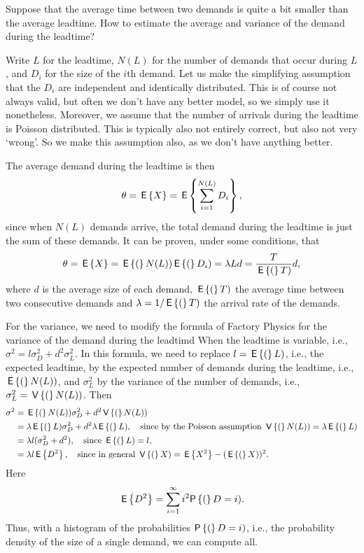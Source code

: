 \begin{question}
  Suppose that the average time between two demands is quite a bit smaller than the average leadtime. How to estimate the average and variance of the demand during the leadtime?
\begin{solution}
  Write $L$ for the leadtime, $N(L)$ for the number of demands that
  occur during $L$, and $D_i$ for the size of the $i$th demand. Let us
  make the simplifying assumption that the $D_i$ are independent and
  identically distributed. This is of course not always valid, but
  often we don't have any better model, so we simply use it
  nonetheless. Moreover, we assume that the number of arrivals during
  the leadtime is Poisson distributed. This is typically also not
  entirely correct, but also not very `wrong'. So we make this
  assumption also, as we don't have anything better.

The average demand during the leadtime is then
\begin{equation*}
\theta = \,\mathsf{E}\left\{X\right\}= \,\mathsf{E}\left\{\sum_{i=1}^{N(L)} D_i\right\},
\end{equation*}
since when $N(L)$ demands arrive, the total demand during the leadtime is just the sum of these demands. It can be proven, under some conditions, that 
\begin{equation*}
  \theta = \,\mathsf{E}\left\{X\right\} = \,\mathsf{E}\left\{(\right\}N(L))\,\mathsf{E}\left\{(\right\}D_i) = \lambda L d=\frac{T}{\,\mathsf{E}\left\{(\right\}T)} d,
\end{equation*}
where $d$ is the average size of each demand, $\,\mathsf{E}\left\{(\right\}T)$ the average
time between two consecutive demands and $\lambda=1/\,\mathsf{E}\left\{(\right\}T)$ the arrival
rate of the demands. 

For the variance, we need to modify the formula of Factory Physics for
the variance of the demand during the leadtimd When the leadtime is
variable, i.e., $\sigma^2 = l\sigma_D^2+d^2 \sigma_L^2$.  In this
formula, we need to replace $l=\,\mathsf{E}\left\{(\right\}L)$, i.e., the expected leadtime, by
the expected number of demands during the leadtime, i.e., $\,\mathsf{E}\left\{(\right\}N(L))$,
and $\sigma_L^2$ by the variance of the number of demands, i.e.,
$\sigma_L^2 = \,\mathsf{V}\left\{(\right\}N(L))$.  Then
\begin{equation*}
  \begin{split}
  \sigma^2 
&= \,\mathsf{E}\left\{(\right\}N(L)) \sigma_D^2+ d^2 \,\mathsf{V}\left\{(\right\}N(L))\\
&= \lambda \,\mathsf{E}\left\{(\right\}L)  \sigma_D^2+ d^2 \lambda \,\mathsf{E}\left\{(\right\}L),\quad\text{since by the Poisson assumption } \,\mathsf{V}\left\{(\right\}N(L))=\lambda \,\mathsf{E}\left\{(\right\}L) \\
&= \lambda l(  \sigma_D^2+ d^2), \quad\text{since } \,\mathsf{E}\left\{(\right\}L) = l,\\
&= \lambda l \,\mathsf{E}\left\{D^2\right\}, \quad\text{since in general } \,\mathsf{V}\left\{(\right\}X) = \,\mathsf{E}\left\{X^2\right\} - (\,\mathsf{E}\left\{(\right\}X))^2.
  \end{split}
\end{equation*}
Here
\begin{equation*}
  \E{D^2} = \sum_{i=1}^\infty i^2\P(D=i).
\end{equation*}
Thus, with a histogram of the probabilities $\P(D=i)$, i.e., the
probability density of the size of a single demand, we can compute
all.


\end{solution}
\end{question}
